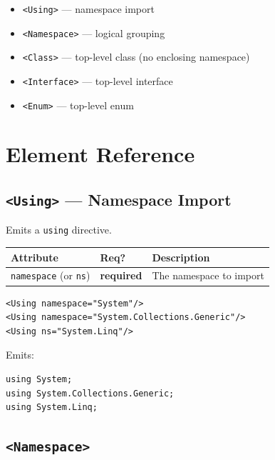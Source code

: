 \documentclass[11pt,a4paper]{article}
\newcommand{\el}[1]{\texttt{\textcolor{xoop-keyword}{<#1>}}}
\newcommand{\attr}[1]{\texttt{\textcolor{xoop-attr}{#1}}}
\newcommand{\cs}[1]{\texttt{#1}}
\newcommand{\required}{\textcolor{xoop-red}{\textbf{required}}}
\begin{document}
\begin{itemize}[nosep]
  \item \el{Using} — namespace import
  \item \el{Namespace} — logical grouping
  \item \el{Class} — top-level class (no enclosing namespace)
  \item \el{Interface} — top-level interface
  \item \el{Enum} — top-level enum
\end{itemize}

\section{Element Reference}

\subsection{\el{Using} — Namespace Import}

Emits a \cs{using} directive.

\begin{center}
\begin{tabular}{lll}
\toprule
Attribute & Req? & Description \\
\midrule
\attr{namespace} (or \attr{ns}) & \required & The namespace to import \\
\bottomrule
\end{tabular}
\end{center}

\begin{lstlisting}[caption={Importing namespaces}]
<Using namespace="System"/>
<Using namespace="System.Collections.Generic"/>
<Using ns="System.Linq"/>
\end{lstlisting}

Emits:
\begin{lstlisting}[style=csstyle, numbers=none]
using System;
using System.Collections.Generic;
using System.Linq;
\end{lstlisting}

\subsection{\el{Namespace}}
\end{document}
